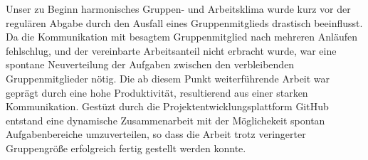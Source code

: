 \documentclass[12pt,a4paper]{scrartcl}
\begin{document}
Unser zu Beginn harmonisches Gruppen- und Arbeitsklima wurde kurz vor der regulären Abgabe durch den Ausfall eines Gruppenmitglieds drastisch beeinflusst. Da die Kommunikation mit besagtem Gruppenmitglied nach mehreren Anläufen fehlschlug, und der vereinbarte Arbeitsanteil nicht erbracht wurde, war eine spontane Neuverteilung der Aufgaben zwischen den verbleibenden Gruppenmitglieder nötig. Die ab diesem Punkt weiterführende Arbeit war geprägt durch eine hohe Produktivität, resultierend aus einer starken Kommunikation. Gestüzt durch die Projektentwicklungsplattform GitHub entstand eine dynamische Zusammenarbeit mit der Möglichekeit spontan Aufgabenbereiche umzuverteilen, so dass die Arbeit trotz veringerter Gruppengröße erfolgreich fertig gestellt werden konnte.
\end{document}
